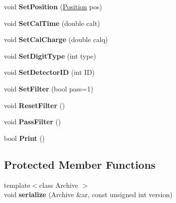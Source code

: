\begin{DoxyCompactItemize}
\item 
\hypertarget{classRecoDigit_a39a5aee7c3779a79cb6e265b8ff9b17f}{void {\bfseries Set\-Position} (\hyperlink{classPosition}{Position} pos)}\label{classRecoDigit_a39a5aee7c3779a79cb6e265b8ff9b17f}

\item 
\hypertarget{classRecoDigit_a90c087145b6e2c98604984e77e516097}{void {\bfseries Set\-Cal\-Time} (double calt)}\label{classRecoDigit_a90c087145b6e2c98604984e77e516097}

\item 
\hypertarget{classRecoDigit_a4d99c1fe4f0c12009fe03d2001fbc34a}{void {\bfseries Set\-Cal\-Charge} (double calq)}\label{classRecoDigit_a4d99c1fe4f0c12009fe03d2001fbc34a}

\item 
\hypertarget{classRecoDigit_ae3d6e5e550ee6dc600c5c4fb3d2cc9b8}{void {\bfseries Set\-Digit\-Type} (int type)}\label{classRecoDigit_ae3d6e5e550ee6dc600c5c4fb3d2cc9b8}

\item 
\hypertarget{classRecoDigit_a0b9aff43d262a25049d48e24128ba134}{void {\bfseries Set\-Detector\-I\-D} (int I\-D)}\label{classRecoDigit_a0b9aff43d262a25049d48e24128ba134}

\item 
\hypertarget{classRecoDigit_af041c9a65186701246312d4f619fb0d7}{void {\bfseries Set\-Filter} (bool pass=1)}\label{classRecoDigit_af041c9a65186701246312d4f619fb0d7}

\item 
\hypertarget{classRecoDigit_a5485213b310d7ad62868ac7b63b36164}{void {\bfseries Reset\-Filter} ()}\label{classRecoDigit_a5485213b310d7ad62868ac7b63b36164}

\item 
\hypertarget{classRecoDigit_a1ef3383052ca57bde6f998a31cf597a4}{void {\bfseries Pass\-Filter} ()}\label{classRecoDigit_a1ef3383052ca57bde6f998a31cf597a4}

\item 
\hypertarget{classRecoDigit_a85dc77b6895110b7fe560ec368edc95b}{bool {\bfseries Print} ()}\label{classRecoDigit_a85dc77b6895110b7fe560ec368edc95b}

\end{DoxyCompactItemize}
\subsection*{Protected Member Functions}
\begin{DoxyCompactItemize}
\item 
\hypertarget{classRecoDigit_a9d0cec7fc8c9b422a07a8c829086dfb4}{{\footnotesize template$<$class Archive $>$ }\\void {\bfseries serialize} (Archive \&ar, const unsigned int version)}\label{classRecoDigit_a9d0cec7fc8c9b422a07a8c829086dfb4}

\end{DoxyCompactItemize}
